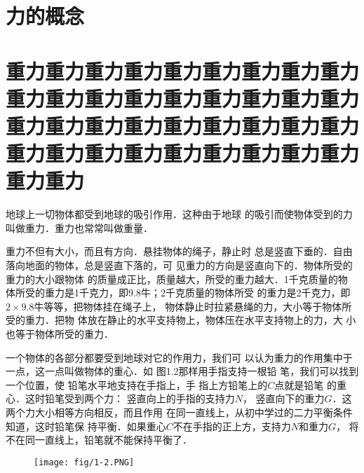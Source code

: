 \section*{力的概念}

\begin{Exercise}
\begin{QsNum}
\item\lipsum[1][2]
\item\lipsum[1][2]
\item\lipsum[1][2]
\item\lipsum[1][2]
\item\lipsum[1][2]
\item\lipsum[1][2]
\end{QsNum}
\end{Exercise}




\section[重力]{重力重力重力重力重力重力重力重力重力重力重力重力重力重力重力重力重力重力重力重力重力重力重力重力重力重力重力重力重力重力重力重力重力重力重力重力重力重力}

    地球上一切物体都受到地球的吸引作用．这种由于地球
的吸引而使物体受到的力叫做\textsf{重力}．重力也常常叫做\textsf{重量}．

    重力不但有大小，而且有方向．悬挂物体的绳子，静止时
总是竖直下垂的．自由落向地面的物体，总是竖直下落的，可
见重力的方向是竖直向下的．物体所受的重力的大小跟物体
的质量成正比，质量越大，所受的重力越大．1千克质量的物
体所受的重力是1千克力，即9.8牛；2千克质量的物体所受
的重力是2千克力，即$2\times 9.8$牛等等，把物体挂在绳子上，
物体静止时拉紧悬绳的力，大小等于物体所受的重力．把物
体放在静止的水平支持物上，物体压在水平支持物上的力，大
小也等于物体所受的重力．

    一个物体的各部分都要受到地球对它的作用力，我们可
以认为重力的作用集中于一点，这一点叫做物体的\textsf{重心}．如
图1.2那样用手指支持一根铅
笔，我们可以找到一个位置，使
铅笔水平地支持在手指上，手
指上方铅笔上的$C$点就是铅笔
的重心．这时铅笔受到两个力：
竖直向上的手指的支持力$N$，
竖直向下的重力$G$．这两个力大小相等方向相反，而且作用
在同一直线上，从初中学过的二力平衡条件知道，这时铅笔保
持平衡．如果重心$C$不在手指的正上方，支持力$N$和重力$G$，
将不在同一直线上，铅笔就不能保持平衡了．
\begin{figure}[htp]
\centering
\texttt{[image: fig/1-2.PNG]}
\caption{}
\end{figure}

